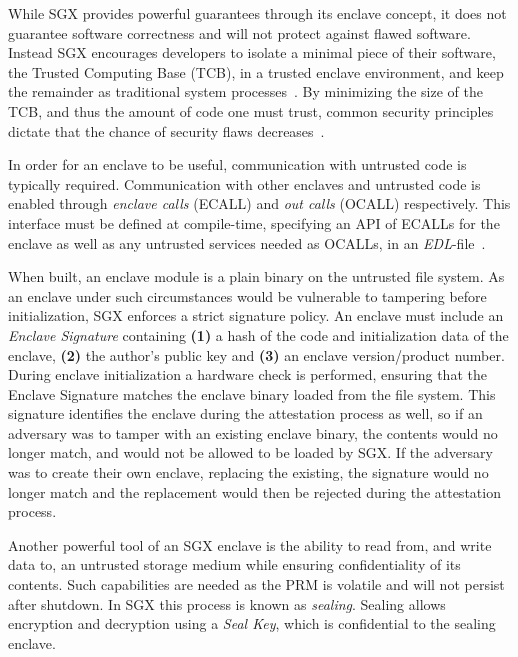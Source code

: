 \documentclass{article}
\begin{document}
			While SGX provides powerful guarantees through its enclave concept, it does not guarantee software correctness and will not protect against flawed software.
			Instead SGX encourages developers to isolate a minimal piece of their software, the Trusted Computing Base (TCB), in a trusted enclave environment, and keep the remainder as traditional system processes~\cite{intel_sgx_guide}.
			By minimizing the size of the TCB, and thus the amount of code one must trust, common security principles dictate that the chance of security flaws decreases~\cite{intel_sgx_guide}.

			In order for an enclave to be useful, communication with untrusted code is typically required.
			Communication with other enclaves and untrusted code is enabled through \textit{enclave calls} (ECALL) and \textit{out calls} (OCALL) respectively.
			This interface must be defined at compile-time, specifying an API of ECALLs for the enclave as well as any untrusted services needed as OCALLs, in an \textit{EDL}-file~\cite{intel_sgx_guide}.

			When built, an enclave module is a plain binary on the untrusted file system.
			As an enclave under such circumstances would be vulnerable to tampering before initialization, SGX enforces a strict signature policy.
			An enclave must include an \textit{Enclave Signature} containing \textbf{(1)} a hash of the code and initialization data of the enclave, \textbf{(2)} the author's public key and \textbf{(3)} an enclave version/product number.
			During enclave initialization a hardware check is performed, ensuring that the Enclave Signature matches the enclave binary loaded from the file system.
			This signature identifies the enclave during the attestation process as well, so if an adversary was to tamper with an existing enclave binary, the contents would no longer match, and would not be allowed to be loaded by SGX.
			If the adversary was to create their own enclave, replacing the existing, the signature would no longer match and the replacement would then be rejected during the attestation process.

			Another powerful tool of an SGX enclave is the ability to read from, and write data to, an untrusted storage medium while ensuring confidentiality of its contents.
			Such capabilities are needed as the PRM is volatile and will not persist after shutdown.
			In SGX this process is known as \textit{sealing}.
			Sealing allows encryption and decryption using a \textit{Seal Key}, which is confidential to the sealing enclave.
\end{document}
